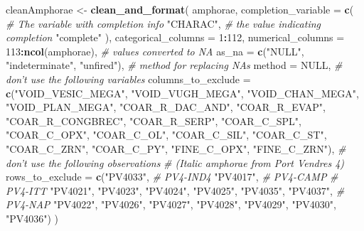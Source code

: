 \documentclass[12pt,]{book}
\newenvironment{Shaded}{\begin{snugshade}}{\end{snugshade}}
\newcommand{\CommentTok}[1]{\textcolor[rgb]{0.56,0.35,0.01}{\textit{#1}}}
\newcommand{\DataTypeTok}[1]{\textcolor[rgb]{0.13,0.29,0.53}{#1}}
\newcommand{\DecValTok}[1]{\textcolor[rgb]{0.00,0.00,0.81}{#1}}
\newcommand{\KeywordTok}[1]{\textcolor[rgb]{0.13,0.29,0.53}{\textbf{#1}}}
\newcommand{\NormalTok}[1]{#1}
\newcommand{\OperatorTok}[1]{\textcolor[rgb]{0.81,0.36,0.00}{\textbf{#1}}}
\newcommand{\OtherTok}[1]{\textcolor[rgb]{0.56,0.35,0.01}{#1}}
\newcommand{\StringTok}[1]{\textcolor[rgb]{0.31,0.60,0.02}{#1}}
\begin{document}
\begin{Shaded}
\begin{Highlighting}[]
\NormalTok{cleanAmphorae <-}\StringTok{ }\KeywordTok{clean_and_format}\NormalTok{(}
\NormalTok{  amphorae,}
  \DataTypeTok{completion_variable =} \KeywordTok{c}\NormalTok{(}
    \CommentTok{# The variable with completion info}
    \StringTok{"CHARAC"}\NormalTok{, }
    \CommentTok{# the value indicating completion}
    \StringTok{"complete"}
\NormalTok{  ), }
  \DataTypeTok{categorical_columns =} \DecValTok{1}\OperatorTok{:}\DecValTok{112}\NormalTok{, }
  \DataTypeTok{numerical_columns =} \DecValTok{113}\OperatorTok{:}\KeywordTok{ncol}\NormalTok{(amphorae),}
  \CommentTok{# values converted to NA}
  \DataTypeTok{as_na =} \KeywordTok{c}\NormalTok{(}\StringTok{"NULL"}\NormalTok{, }\StringTok{"indeterminate"}\NormalTok{, }\StringTok{"unfired"}\NormalTok{),}
  \CommentTok{# method for replacing NAs}
  \DataTypeTok{method =} \OtherTok{NULL}\NormalTok{, }
  \CommentTok{# don't use the following variables}
  \DataTypeTok{columns_to_exclude =} \KeywordTok{c}\NormalTok{(}\StringTok{"VOID_VESIC_MEGA"}\NormalTok{, }\StringTok{"VOID_VUGH_MEGA"}\NormalTok{,}
                         \StringTok{"VOID_CHAN_MEGA"}\NormalTok{, }\StringTok{"VOID_PLAN_MEGA"}\NormalTok{,}
                         \StringTok{"COAR_R_DAC_AND"}\NormalTok{, }\StringTok{"COAR_R_EVAP"}\NormalTok{,}
                         \StringTok{"COAR_R_CONGBREC"}\NormalTok{, }\StringTok{"COAR_R_SERP"}\NormalTok{,}
                         \StringTok{"COAR_C_SPL"}\NormalTok{, }\StringTok{"COAR_C_OPX"}\NormalTok{,}
                         \StringTok{"COAR_C_OL"}\NormalTok{, }\StringTok{"COAR_C_SIL"}\NormalTok{,}
                         \StringTok{"COAR_C_ST"}\NormalTok{, }\StringTok{"COAR_C_ZRN"}\NormalTok{,}
                         \StringTok{"COAR_C_PY"}\NormalTok{, }\StringTok{"FINE_C_OPX"}\NormalTok{,}
                         \StringTok{"FINE_C_ZRN"}\NormalTok{),}
  \CommentTok{# don't use the following observations}
  \CommentTok{# (Italic amphorae from Port Vendres 4)}
  \DataTypeTok{rows_to_exclude =} \KeywordTok{c}\NormalTok{(}\StringTok{"PV4033"}\NormalTok{, }\CommentTok{# PV4-IND4}
                      \StringTok{"PV4017"}\NormalTok{, }\CommentTok{# PV4-CAMP}
                      \CommentTok{# PV4-ITT}
                      \StringTok{"PV4021"}\NormalTok{, }\StringTok{"PV4023"}\NormalTok{, }\StringTok{"PV4024"}\NormalTok{, }
                      \StringTok{"PV4025"}\NormalTok{, }\StringTok{"PV4035"}\NormalTok{, }\StringTok{"PV4037"}\NormalTok{,}
                      \CommentTok{# PV4-NAP}
                      \StringTok{"PV4022"}\NormalTok{, }\StringTok{"PV4026"}\NormalTok{, }\StringTok{"PV4027"}\NormalTok{, }
                      \StringTok{"PV4028"}\NormalTok{, }\StringTok{"PV4029"}\NormalTok{, }\StringTok{"PV4030"}\NormalTok{,}
                      \StringTok{"PV4036"}\NormalTok{)}
\NormalTok{)}
\end{Highlighting}
\end{Shaded}
\end{document}
